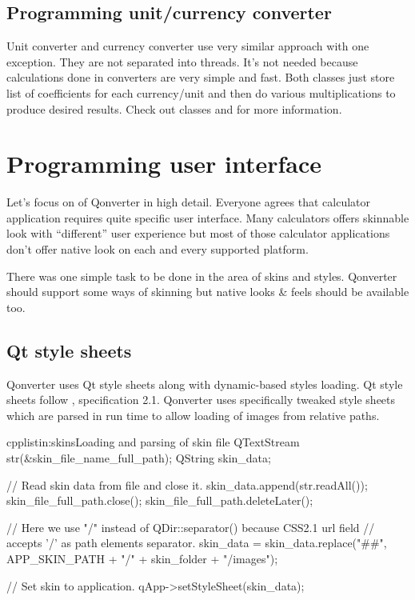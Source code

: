 \subsection{Programming unit/currency converter}
Unit converter and currency converter use very similar approach with one exception. They are not separated into threads. It's not needed because calculations done in converters are very simple and fast. Both classes just store list of coefficients for each currency/unit and then do various multiplications to produce desired results. Check out classes and for more information.

\section{Programming user interface}
Let's focus on  of Qonverter in high detail. Everyone agrees that calculator application requires quite specific user interface. Many calculators offers skinnable look with \enquote{different} user experience but most of those calculator applications don't offer native look on each and every supported platform.

There was one simple task to be done in the area of skins and styles. Qonverter should support some ways of skinning but native looks \& feels should be available too.

\subsection{Qt style sheets}
Qonverter uses Qt style sheets \citep[style sheets]{various:qtdoc} along with dynamic-based styles loading. Qt style sheets follow , specification 2.1. Qonverter uses specifically tweaked style sheets which are parsed in run time to allow loading of images from relative paths.

\begin{fdoccode}{cpp}{listin:skins}{Loading and parsing of skin file}
QTextStream str(&skin_file_name_full_path);
QString skin_data;

// Read skin data from file and close it.
skin_data.append(str.readAll());
skin_file_full_path.close();
skin_file_full_path.deleteLater();

// Here we use "/" instead of QDir::separator() because CSS2.1 url field
// accepts '/' as path elements separator.
skin_data = skin_data.replace("##",
			APP_SKIN_PATH + "/" + skin_folder + "/images");

// Set skin to application.
qApp->setStyleSheet(skin_data);
\end{fdoccode}

